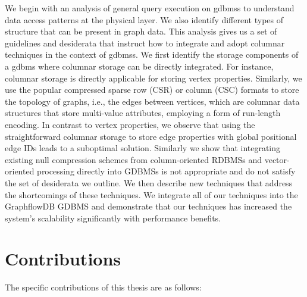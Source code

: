 We begin with an analysis of general query execution on \gls{gdbms}s to understand data access patterns at the physical layer. We also identify different types of structure that can be present in graph data. This analysis gives us a set of guidelines and desiderata that instruct how to integrate and adopt columnar techniques in the context of \gls{gdbms}s. We first identify the storage components of a \gls{gdbms} where columnar storage can be directly integrated. For instance, columnar storage is directly applicable for storing vertex properties. Similarly, we use the popular compressed sparse row (CSR) or column (CSC) formats to store the topology of graphs, i.e., the edges between vertices, which are columnar data structures that store multi-value attributes, employing a form of run-length encoding. In contrast to vertex properties, we observe that using the straightforward columnar storage to store edge properties with global positional edge IDs leads to a suboptimal solution. Similarly we show that integrating existing null compression schemes from column-oriented RDBMSs and vector-oriented processing directly into GDBMSs is not appropriate and do not satisfy the set of desiderata we outline. We then describe new techniques that address the shortcomings of these techniques. We integrate all of our techniques into the GraphflowDB GDBMS and demonstrate that our techniques has increased the system's scalability significantly with performance benefits.

\section{Contributions}

The specific contributions of this thesis are as follows:

